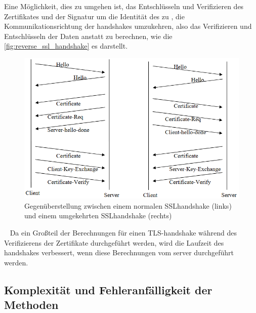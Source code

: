 Eine Möglichkeit, dies zu umgehen ist, das Entschlüsseln und Verifizieren des Zertifikates und der Signatur um die Identität des  zu , die Kommunikationsrichtung der \glspl{handshake} umzukehren, also das Verifizieren und Entschlüsseln der Daten  anstatt  zu berechnen\autocite[\vglf][]{cryptoeprint:2006/212}, wie die \autoref{fig:reverse_ssl_handshake}\autocite[]{cryptoeprint:2006/212} es darstellt.
\begin{figure}[htpb]
    \centering
    \includegraphics[width=1\linewidth]{abbildungen/reverse_ssl_handshake}
    \caption[Gegenüberstellung zwischen einem normalen SSL-Handshake (links) und einem umgekehrten SSL-Handshake (rechts)]{Gegenüberstellung zwischen einem normalen \ac{SSL}\nonbreakdash\gls{handshake} (links) und einem umgekehrten \ac{SSL}\nonbreakdash\gls{handshake} (rechts)\footnotemark}
    \label{fig:reverse_ssl_handshake}
\end{figure}~
Da ein Großteil der Berechnungen für einen \ac{TLS}-\gls{handshake} während des Verifizierens der Zertifikate durchgeführt werden, wird die Laufzeit des \glspl{handshake} verbessert, wenn diese Berechnungen vom \gls{server} durchgeführt werden.

\subsection[Komplexität und Fehleranfälligkeit der Kryptografischen Methoden]{Komplexität und Fehleranfälligkeit der  Methoden}\label{subsec:komplexitaet_und_fehleranfaelligkeit_der_kryptografie}

